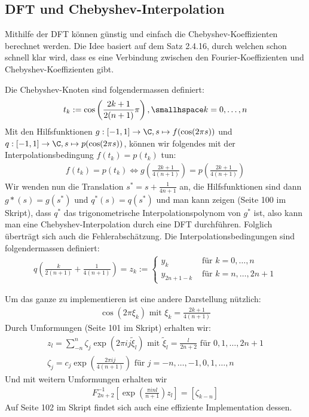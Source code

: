 \newsection
\subsection{DFT und Chebyshev-Interpolation}
Mithilfe der DFT können günstig und einfach die Chebyshev-Koeffizienten berechnet werden.
Die Idee basiert auf dem Satz 2.4.16, durch welchen schon schnell klar wird, dass es eine Verbindung zwischen den Fourier-Koeffizienten und Chebyshev-Koeffizienten gibt.

Die Chebyshev-Knoten sind folgendermassen definiert:
\begin{align*}
    t_k := \cos\left( \frac{2k + 1}{2(n + 1)} \pi \right), \smallhspace k = 0, \ldots, n
\end{align*}
Mit den Hilfsfunktionen $g: [-1, 1] \rightarrow \C, s \mapsto f(\cos(2\pi s))$ und $q: [-1, 1] \rightarrow \C, s \mapsto p(\cos(2\pi s))$,
können wir folgendes mit der Interpolationsbedingung $f(t_k) = p(t_k)$ tun:
\begin{align*}
    f(t_k) = p(t_k) \Longleftrightarrow g\left( \frac{2k + 1}{4(n + 1)} \right) = p\left( \frac{2k + 1}{4(n + 1)} \right)
\end{align*}
Wir wenden nun die Translation $s^* = s + \frac{1}{4n + 1}$ an, die Hilfsfunktionen sind dann $g*(s) = g(s^*)$ und $q^*(s) = q(s^*)$
und man kann zeigen (Seite 100 im Skript), dass $q^*$ das trigonometrische Interpolationspolynom von $g^*$ ist,
also kann man eine Chebyshev-Interpolation durch eine DFT durchführen.
Folglich überträgt sich auch die Fehlerabschätzung. Die Interpolationsbedingungen sind folgendermassen definiert:
\begin{align*}
    q\left( \frac{k}{2(n + 1)} + \frac{1}{4(n + 1)} \right) = z_k :=
    \begin{cases}
        y_k            & \text{ für } k = 0, \ldots, n \\
        y_{2n + 1 - k} & \text{ für } k = n, \ldots, 2n + 1
    \end{cases}
\end{align*}

Um das ganze zu implementieren ist eine andere Darstellung nützlich:
\begin{align*}
    \cos(2\pi \xi_k) \text{ mit } \xi_k = \frac{2k + 1}{4(n + 1)}
\end{align*}
Durch Umformungen (Seite 101 im Skript) erhalten wir:
\begin{align*}
    z_l = \sum_{-n}^{n} \zeta_j \exp\left( 2\pi ij \tilde{\xi}_l \right) \text{ mit } \tilde{\xi}_l = \frac{l}{2n + 2} \text{ für } 0, 1, \ldots, 2n + 1\\
    \zeta_j = c_j \exp\left( \frac{2 \pi ij}{4(n + 1)} \right) \text{ für } j = -n, \ldots, -1, 0, 1, \ldots, n
\end{align*}
Und mit weitern Umformungen erhalten wir
\begin{align*}
    F^{-1}_{2n + 2} \left[ \exp\left( \frac{\pi inl}{n + 1} \right) z_l \right] = [\zeta_{k -n}]
\end{align*}
Auf Seite 102 im Skript findet sich auch eine effiziente Implementation dessen.

